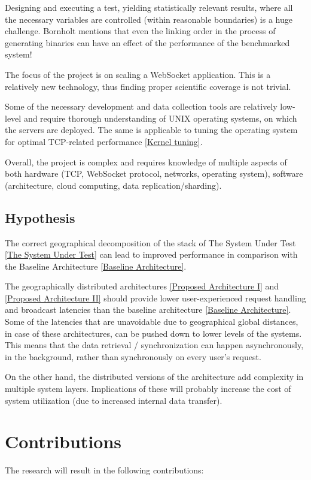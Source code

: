 \documentclass{uvamscse}
\begin{document}
Designing and executing a test, yielding statistically relevant results, where all the necessary variables are controlled (within reasonable boundaries) is a huge challenge. Bornholt \cite{BornBen} mentions that even the linking order in the process of generating binaries can have an effect of the performance of the benchmarked system!

The focus of the project is on scaling a WebSocket application. This is a relatively new technology, thus finding proper scientific coverage is not trivial.

Some of the necessary development and data collection tools are relatively low-level and require thorough understanding of UNIX operating systems, on which the servers are deployed. The same is applicable to tuning the operating system for optimal TCP-related performance \ref{Kernel tuning}.

Overall, the project is complex and requires knowledge of multiple aspects of both hardware (TCP, WebSocket protocol, networks, operating system), software (architecture, cloud computing, data replication/sharding).

\subsection{Hypothesis}
The correct geographical decomposition of the stack of The System Under Test \ref{The System Under Test} can lead to improved performance in comparison with the Baseline Architecture \ref{Baseline Architecture}.

The geographically distributed architectures \ref{Proposed Architecture I} and \ref{Proposed Architecture II} should provide lower user-experienced request handling and broadcast latencies than the baseline architecture \ref{Baseline Architecture}. Some of the latencies that are unavoidable due to geographical global distances, in case of these architectures, can be pushed down to lower levels of the systems. This means that the data retrieval / synchronization can happen asynchronously, in the background, rather than synchronously on every user's request.


On the other hand, the distributed versions of the architecture add complexity in multiple system layers. Implications of these will probably increase the cost of system utilization (due to increased internal data transfer).

\section{Contributions}
The research will result in the following contributions:
\end{document}
